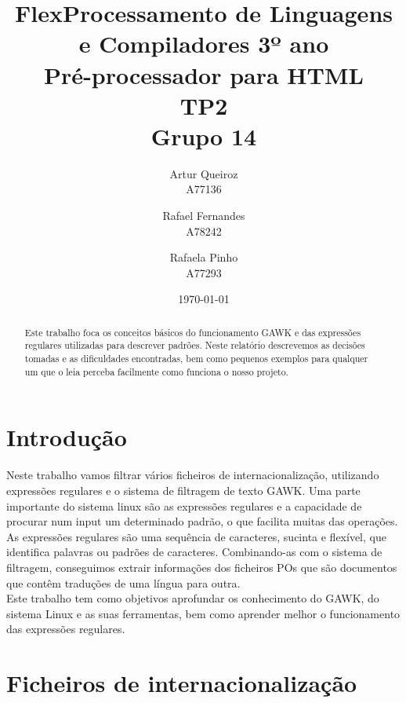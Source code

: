 \documentclass{report}
\title{Flex}
\title{Processamento de Linguagens e Compiladores 3º ano\\ \textbf{Pré-processador para HTML}\\ TP2\\ Grupo 14}
\author{Artur Queiroz\\ A77136 \and  Rafael Fernandes\\ A78242 \and Rafaela Pinho\\ A77293 }
\date{\today}
\begin{document}
\maketitle

\begin{abstract}
Este trabalho foca os conceitos básicos do funcionamento GAWK e das expressões regulares utilizadas para descrever padrões.
Neste relatório descrevemos as decisões tomadas e as dificuldades encontradas, bem como pequenos exemplos para qualquer um que o leia perceba facilmente como funciona o nosso projeto.
\end{abstract}

\tableofcontents

\chapter{Introdução} \label{intro}
Neste trabalho vamos filtrar vários ficheiros de internacionalização, utilizando expressões regulares e o sistema de filtragem de texto GAWK. Uma parte importante do sistema linux são as expressões regulares e a capacidade de procurar num input um determinado padrão, o que facilita muitas das operações.\\
As expressões regulares são uma sequência de caracteres, sucinta e flexível, que identifica palavras ou padrões de caracteres. Combinando-as com o sistema de filtragem, conseguimos extrair informações dos ficheiros POs que são documentos que contêm traduções de uma língua para outra.\\
Este trabalho tem como objetivos aprofundar os conhecimento do GAWK, do sistema Linux e as suas ferramentas, bem como aprender melhor o funcionamento das expressões regulares.


\chapter{Ficheiros de internacionalização} \label{fi}
\end{document}
